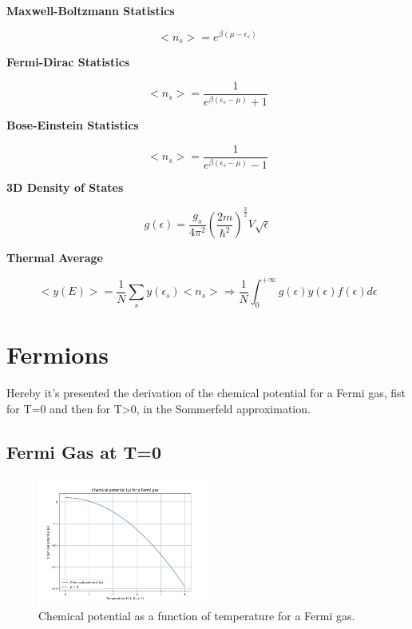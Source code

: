 \documentclass{article}
\begin{document}
\newpage
\begin{tcolorbox}[colframe=gray!90, colback=gray!5, coltitle=white, sharp corners, title=\textbf{Quantum Statistical Mechanics, Summary}, fonttitle=\large\bfseries]
    \textbf{Maxwell-Boltzmann Statistics}

    \begin{equation}
        <n_s>=e^{\beta(\mu-\epsilon_s)}
    \end{equation}

    \textbf{Fermi-Dirac Statistics}

    \begin{equation}
        <n_s>=\frac{1}{e^{\beta(\epsilon_s-\mu)}+1}
    \end{equation}

    \textbf{Bose-Einstein Statistics}

    \begin{equation}
        <n_s>=\frac{1}{e^{\beta(\epsilon_s-\mu)}-1}
    \end{equation}

    \textbf{3D Density of States}

    \begin{equation}
        g(\epsilon)=\frac{g_s}{4\pi^2}\left( \frac{2m}{\hbar^2} \right)^{\frac{3}{2}}V\sqrt{\epsilon}
    \end{equation}

    \textbf{Thermal Average}

    \begin{equation}
        <y(E)>=\frac{1}{N}\sum_{s}y(\epsilon_s)<n_s>\Longrightarrow \frac{1}{N}\int_0^{+\infty}g(\epsilon)y(\epsilon)f(\epsilon)d\epsilon
    \end{equation}
\end{tcolorbox}
\newpage

\section{Fermions}

Hereby it's presented the derivation of the chemical potential for a Fermi gas,
fist for T=0 and then for T>0, in the Sommerfeld approximation.

\subsection{Fermi Gas at T=0}

\begin{figure}[h]
    \centering
    \includegraphics[width=0.5\textwidth]{images/statistical-physics/mu-fermions.png}
    \caption{Chemical potential as a function of temperature for a Fermi gas.}
    \label{fig:mu-fermions}
\end{figure}
\end{document}
